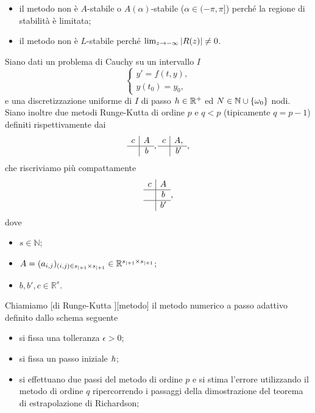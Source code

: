 \begin{itemize}
	\item il metodo non \`e $A$-stabile o $A(\alpha)$-stabile ($\alpha \in (-\pi,\pi]$)  perch\'e la regione di stabilit\`a \`e limitata;
	\item il metodo non \`e $L$-stabile perch\'e $\lim_{z \rightarrow - \infty} \left \lvert R(z) \right \rvert \neq 0$. \EndProof
\end{itemize}
\begin{Definition}
\label{MetodiNumericiPerEquazioniDifferenzialiOrdinarie_Definizione_MetodoDiRungeKutta_Embedded}
	Siano dati un problema di Cauchy su un intervallo $I$
	\[
	\begin{cases}
		y' = f(t,y),\\
		y(t_0) = y_0,
	\end{cases}
	\]
	e una discretizzazione uniforme di $I$ di passo $h \in \mathbb{R}^+$ ed $N \in \mathbb{N} \cup \lbrace \omega_0 \rbrace$ nodi. Siano inoltre due metodi Runge-Kutta di ordine $p$ e $q < p$ (tipicamente $q = p - 1$) definiti rispettivamente dai \tableau
	\[
		\begin{array}{c|c}
		c	&	A\\
		\hline
			&	b
		\end{array},
		\begin{array}{c|c}
		c	&	A,\\
		\hline
			&	b'
		\end{array},
	\]
	che riscriviamo pi\`u compattamente
	\[
		\begin{array}{c|c}
		c	&	A\\
		\hline
			&	b\\
		\hline
			&	b'
		\end{array},
	\]
	dove
	\begin{itemize}
		\item $s \in \mathbb{N}$;
		\item $A = (a_{i,j})_{(i,j) \in {s}_{|+ 1} \times {s}_{|+ 1}} \in \mathbb{R}^{{s}_{|+ 1} \times {s}_{|+ 1}}$;
		\item $b, b', c \in \mathbb{R}^s$.
	\end{itemize}
	Chiamiamo [di Runge-Kutta \embedded][metodo] il metodo numerico a passo adattivo definito dallo schema seguente
	\begin{itemize}
		\item si fissa una tolleranza $\epsilon > 0$;
		\item si fissa un passo iniziale $h$;
		\item si effettuano due passi del metodo di ordine $p$ e si stima l'errore utilizzando il metodo di ordine $q$ ripercorrendo i passaggi della dimostrazione del teorema di estrapolazione di Richardson;

\end{itemize}
\end{Definition}
